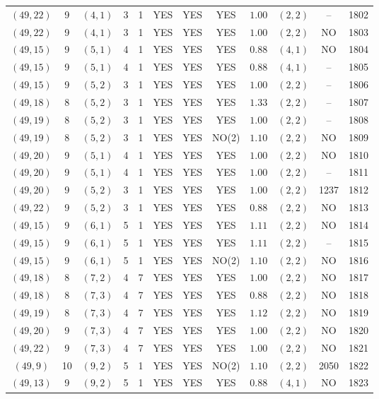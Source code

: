 \begin{longtable}{|c|c|c|c|c|c|c|c|c|c|c|c|}
$(49,22)$ & 9 & $(4,1)$ & 3 & 1 & YES & YES & YES & $1.00$ & $(2,2)$ & -- & 1802\\
$(49,22)$ & 9 & $(4,1)$ & 3 & 1 & YES & YES & YES & $1.00$ & $(2,2)$ & NO & 1803\\
$(49,15)$ & 9 & $(5,1)$ & 4 & 1 & YES & YES & YES & $0.88$ & $(4,1)$ & NO & 1804\\
$(49,15)$ & 9 & $(5,1)$ & 4 & 1 & YES & YES & YES & $0.88$ & $(4,1)$ & -- & 1805\\
$(49,15)$ & 9 & $(5,2)$ & 3 & 1 & YES & YES & YES & $1.00$ & $(2,2)$ & -- & 1806\\
$(49,18)$ & 8 & $(5,2)$ & 3 & 1 & YES & YES & YES & $1.33$ & $(2,2)$ & -- & 1807\\
$(49,19)$ & 8 & $(5,2)$ & 3 & 1 & YES & YES & YES & $1.00$ & $(2,2)$ & -- & 1808\\
$(49,19)$ & 8 & $(5,2)$ & 3 & 1 & YES & YES & NO(2) & $1.10$ & $(2,2)$ & NO & 1809\\
$(49,20)$ & 9 & $(5,1)$ & 4 & 1 & YES & YES & YES & $1.00$ & $(2,2)$ & NO & 1810\\
$(49,20)$ & 9 & $(5,1)$ & 4 & 1 & YES & YES & YES & $1.00$ & $(2,2)$ & -- & 1811\\
$(49,20)$ & 9 & $(5,2)$ & 3 & 1 & YES & YES & YES & $1.00$ & $(2,2)$ & 1237 & 1812\\
$(49,22)$ & 9 & $(5,2)$ & 3 & 1 & YES & YES & YES & $0.88$ & $(2,2)$ & NO & 1813\\
$(49,15)$ & 9 & $(6,1)$ & 5 & 1 & YES & YES & YES & $1.11$ & $(2,2)$ & NO & 1814\\
$(49,15)$ & 9 & $(6,1)$ & 5 & 1 & YES & YES & YES & $1.11$ & $(2,2)$ & -- & 1815\\
$(49,15)$ & 9 & $(6,1)$ & 5 & 1 & YES & YES & NO(2) & $1.10$ & $(2,2)$ & NO & 1816\\
$(49,18)$ & 8 & $(7,2)$ & 4 & 7 & YES & YES & YES & $1.00$ & $(2,2)$ & NO & 1817\\
$(49,18)$ & 8 & $(7,3)$ & 4 & 7 & YES & YES & YES & $0.88$ & $(2,2)$ & NO & 1818\\
$(49,19)$ & 8 & $(7,3)$ & 4 & 7 & YES & YES & YES & $1.12$ & $(2,2)$ & NO & 1819\\
$(49,20)$ & 9 & $(7,3)$ & 4 & 7 & YES & YES & YES & $1.00$ & $(2,2)$ & NO & 1820\\
$(49,22)$ & 9 & $(7,3)$ & 4 & 7 & YES & YES & YES & $1.00$ & $(2,2)$ & NO & 1821\\
$(49,9)$ & 10 & $(9,2)$ & 5 & 1 & YES & YES & NO(2) & $1.10$ & $(2,2)$ & 2050 & 1822\\
$(49,13)$ & 9 & $(9,2)$ & 5 & 1 & YES & YES & YES & $0.88$ & $(4,1)$ & NO & 1823\\

\end{longtable}
